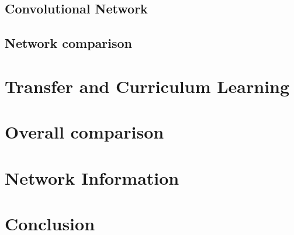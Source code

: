 \subsection{Convolutional Network}

\subsection{Network comparison}

\section{Transfer and Curriculum Learning}

\section{Overall comparison}

\section{Network Information}

\section{Conclusion}

